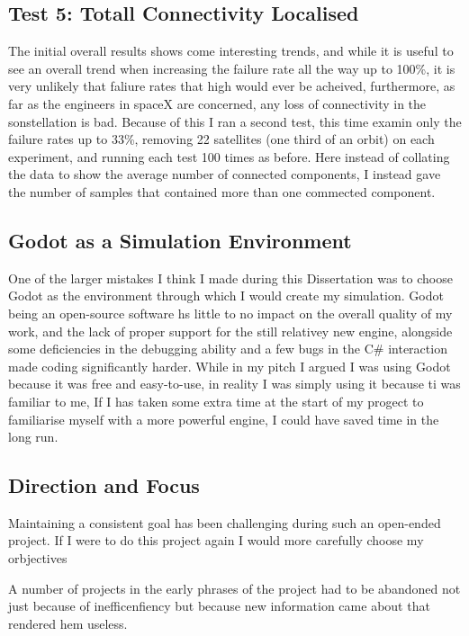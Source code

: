 \documentclass[12pt]{article}
\begin{document}
\subsection{Test 5: Totall Connectivity Localised}

The initial overall results shows come interesting trends, and while it is useful to see an overall trend when increasing the failure rate all the way up to 100\%, it is very unlikely that faliure rates that high would ever be acheived, furthermore, as far as the engineers in spaceX are concerned, any loss of connectivity in the sonstellation is bad. Because of this I ran a second test, this time examin only the failure rates up to 33\%, removing 22 satellites (one third of an orbit) on each experiment, and running each test 100 times as before. Here instead of collating the data to show the average number of connected components, I instead gave the number of samples that contained more than one commected component. %

\subsection{Godot as a Simulation Environment}

One of the larger mistakes I think I made during this Dissertation was to choose Godot as the environment through which I would create my simulation. Godot being an open-source software hs little to no impact on the overall quality of my work, and the lack of proper support for the still relativey new engine, alongside some deficiencies in the debugging ability and a few bugs in the C\# interaction made coding significantly harder. While in my pitch I argued I was using Godot because it was free and easy-to-use, in reality I was simply using it because ti was familiar to me, If I has taken some extra time at the start of my progect to familiarise myself with a more powerful engine, I could have saved time in the long run.

\subsection{Direction and Focus}

Maintaining a consistent goal has been challenging during such an open-ended project. If I were to do this project again I would more carefully choose my orbjectives %

A number of projects in the early phrases of the project had to be abandoned not just because of inefficenfiency but because new information came about that rendered hem useless.
\end{document}
